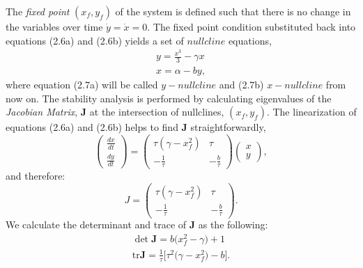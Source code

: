 The \textit{fixed point} $(x_f, y_f)$ of the system is defined such that there is no change in the variables over time $\dot{y} =\dot{x} = 0 $. The fixed point condition substituted back into equations (2.6a) and (2.6b) yields a set of $nullcline$ equations, 
\begin{subequations}
\begin{align}  y = \frac{x^3}{3} - \gamma x
              \label{eqn: frobenius 3}\\  
               x = \alpha - b y ,
               \label{eqn: frobenius 4}   \end{align} 
\end{subequations}
where equation (2.7a) will be called $y-nullcline$ and (2.7b) $x-nullcline$ from now on. The stability analysis is performed by calculating eigenvalues of the \textit{Jacobian Matrix}, \textbf{J} at the intersection of nullclines, $(x_f, y_f)$. The  linearization of equations (2.6a) and (2.6b) helps to find  \textbf{J} straightforwardly,
\begin{equation}
%
    \begin{pmatrix}
        \frac{dx}{dt} \\ \frac{dy}{dt}
     \end{pmatrix} = \begin{pmatrix}
        \tau(\gamma - x_f^2) & \tau \\
        -\frac{1}{\tau}     & -\frac{b}{\tau}
     \end{pmatrix}
    \begin{pmatrix}
        x \\
        y
    \end{pmatrix} ,
%
\end{equation}
and therefore:
\begin{equation}
J = %
    \begin{pmatrix} \tau(\gamma - x_f^2) & \tau \\ -\frac{1}{\tau}     & -\frac{b}{\tau}   \end{pmatrix}
% 
. \end{equation}
We calculate the determinant and trace of \textbf{J} as the following:
\begin{subequations}
\begin{align}   
 \det \textbf{J} =  b \big( x_f^2 - \gamma  \big)+1
               \label{eqn: frobenius 6} \\   
\mathrm{tr} \textbf{J} =  \frac{1}{\tau} \Big[ \tau^2 \big( \gamma - x_f^2 \big) -b \Big] . 
               \label{eqn: frobenius 7}                 
               \end{align} 
\end{subequations}
